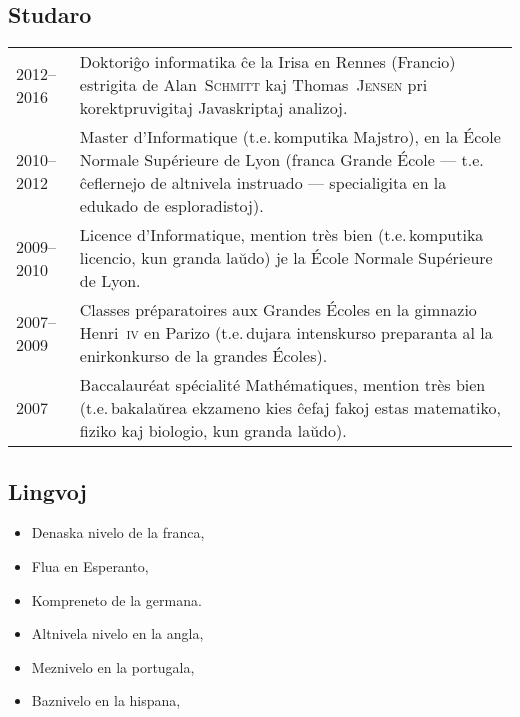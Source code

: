 \documentclass[12pt,a4paper]{article}
\makeatletter
\newcommand{\fr}[1]{\foreignlanguage{french}{{#1}}}
\newcommand{\fr}[1]{\foreignlanguage{french}{{#1}}}
\newcommand{\ie}{t.e.\,}
\newenvironment{datecvsection}[1]%
               {\subsection*{#1}%
                 \noindent \begin{tabular}{@{}p{\annee}p{\texte}@{}}}
               {\end{tabular}}
\newenvironment{cvsection}[1]%
               {\subsection*{#1}}
               {}
\newcommand\familyName{\textsc}
\newcommand\placeName{}
\makeatother
\begin{document}
\begin{datecvsection}{Studaro}

    2012–2016 & Doktoriĝo informatika ĉe la \placeName{Irisa} en \placeName{Rennes} (\placeName{Francio}) estrigita de Alan~\familyName{Schmitt} kaj Thomas~\familyName{Jensen} pri korektpruvigitaj {Javaskript}aj analizoj. \\

    2010–2012 & \fr{Master d’Informatique} (\ie komputika Majstro), en la \fr{\placeName{École Normale Supérieure de Lyon}} (franca \fr{Grande École} — \ie ĉeflernejo de altnivela instruado — specialigita en la edukado de esploradistoj). \\

    2009–2010 & \fr{Licence d’Informatique, mention très bien} (\ie komputika licencio, kun granda laŭdo) je la \fr{\placeName{École Normale Supérieure de Lyon}}. \\

    2007–2009 & \fr{Classes préparatoires aux Grandes Écoles} en la gimnazio \placeName{Henri~\textsc{iv}} en \placeName{Parizo} (\ie dujara intenskurso preparanta al la enirkonkurso de la \fr{grandes Écoles}). \\

    2007 & \fr{Baccalauréat spécialité Mathématiques, mention très bien} (\ie bakalaŭrea ekzameno kies ĉefaj fakoj estas matematiko, fiziko kaj biologio, kun granda laŭdo). \\

\end{datecvsection}

\begin{cvsection}{Lingvoj}
\parbox{.4\textwidth}{
\begin{itemize}
   \item Denaska nivelo de la franca,
   \item Flua en Esperanto,
   \item Kompreneto de la germana.
\end{itemize}}
\parbox{.55\textwidth}{
\begin{itemize}
   \item Altnivela nivelo en la angla,
   \item Meznivelo en la portugala,
   \item Baznivelo en la hispana,
\end{itemize}}
\end{cvsection}
\end{document}
